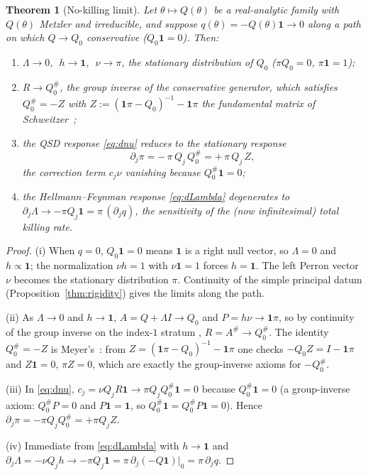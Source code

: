 \documentclass[11pt,reqno]{amsart}
\theoremstyle{plain}
\newtheorem{theorem}{Theorem}[section]
\theoremstyle{definition}
\theoremstyle{remark}
\newcommand{\one}{\mathbf{1}}
\begin{document}
\begin{theorem}[No-killing limit]\label{thm:conservative-limit}
Let $\theta\mapsto Q(\theta)$ be a real-analytic family with $Q(\theta)$ Metzler
and irreducible, and suppose $q(\theta)=-Q(\theta)\one\to0$ along a path on which
$Q\to Q_0$ conservative \textup{(}$Q_0\one=0$\textup{)}. Then:
\begin{enumerate}[label=\textup{(\roman*)}]
\item $\Lambda\to0$, $\;h\to\one$, $\;\nu\to\pi$, the stationary distribution of
$Q_0$ \textup{(}$\pi Q_0=0$, $\pi\one=1$\textup{)};
\item $R\to Q_0^{\#}$, the group inverse of the conservative generator, which
satisfies $Q_0^{\#}=-Z$ with $Z:=(\one\pi-Q_0)^{-1}-\one\pi$ the fundamental matrix
of Schweitzer~\cite{Schweitzer1968};
\item the QSD response \eqref{eq:dnu} reduces to the stationary response
\begin{equation}\label{eq:dpi}
\partial_j\pi=-\,\pi\,Q_j\,Q_0^{\#}=+\,\pi\,Q_j\,Z,
\end{equation}
the correction term $c_j\nu$ vanishing because $Q_0^{\#}\one=0$;
\item the Hellmann--Feynman response \eqref{eq:dLambda} degenerates to
$\partial_j\Lambda\to-\pi Q_j\one=\pi\,(\partial_jq)$, the sensitivity of the
\textup{(}now infinitesimal\textup{)} total killing rate.
\end{enumerate}
\end{theorem}

\begin{proof}
(i) When $q=0$, $Q_0\one=0$ means $\one$ is a right null vector, so
$\Lambda=0$ and $h\propto\one$; the normalization $\nu h=1$ with $\nu\one=1$ forces
$h=\one$. The left Perron vector $\nu$ becomes the stationary distribution $\pi$.
Continuity of the simple principal datum (Proposition~\ref{thm:rigidity}) gives the
limits along the path.

(ii) As $\Lambda\to0$ and $h\to\one$, $A=Q+\Lambda I\to Q_0$ and $P=h\nu\to\one\pi$,
so by continuity of the group inverse on the index-$1$ stratum
\cite[Ch.~4]{CampbellMeyer2009}, $R=A^{\#}\to Q_0^{\#}$. The identity
$Q_0^{\#}=-Z$ is Meyer's~\cite[Thm.~2.1]{Meyer1975}: from $Z=(\one\pi-Q_0)^{-1}-\one\pi$
one checks $-Q_0Z=I-\one\pi$ and $Z\one=0$, $\pi Z=0$, which are exactly the
group-inverse axioms for $-Q_0^{\#}$.

(iii) In \eqref{eq:dnu}, $c_j=\nu Q_jR\one\to\pi Q_jQ_0^{\#}\one=0$ because
$Q_0^{\#}\one=0$ (a group-inverse axiom: $Q_0^{\#}P=0$ and $P\one=\one$, so
$Q_0^{\#}\one=Q_0^{\#}P\one=0$). Hence $\partial_j\pi=-\pi Q_jQ_0^{\#}=+\pi Q_jZ$.

(iv) Immediate from \eqref{eq:dLambda} with $h\to\one$ and
$\partial_j\Lambda=-\nu Q_jh\to-\pi Q_j\one=\pi\,\partial_j(-Q\one)|_0=\pi\,\partial_jq$.
\end{proof}
\end{document}

